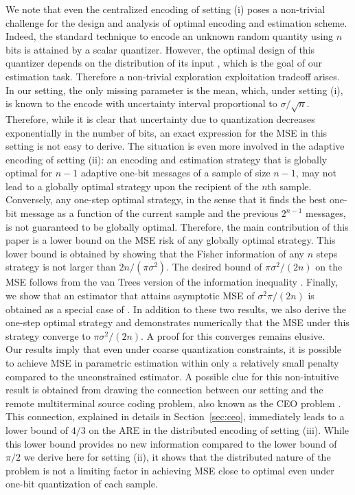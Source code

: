 \documentclass[letterpaper, conference]{IEEEtran}      %
\begin{document}
We note that even the centralized encoding of setting (i) poses a non-trivial challenge for the design and analysis of optimal encoding and estimation scheme. Indeed, the standard technique to encode an unknown random quantity using $n$ bits is attained by a scalar quantizer. However, the optimal design of this quantizer depends on the distribution of its input \cite{gray1998quantization}, which is the goal of our estimation task. Therefore a non-trivial exploration exploitation tradeoff arises. In our setting, the only missing parameter is the mean, which, under setting (i), is known to the encode with uncertainty interval proportional to $\sigma/\sqrt{n}$. Therefore, while it is clear that uncertainty due to quantization decreases exponentially in the number of bits, an exact expression for the MSE in this setting is not easy to derive. The situation is even more involved in the adaptive encoding of setting (ii): an encoding and estimation strategy that is globally optimal for $n-1$ adaptive one-bit messages of a sample of size $n-1$, may not lead to a globally optimal strategy upon the recipient of the $n$th sample. Conversely, any one-step optimal strategy, in the sense that it finds the best one-bit message as a function of the current sample and the previous $2^{n-1}$ messages, is not guaranteed to be globally optimal. Therefore, the main contribution of this paper is a lower bound on the MSE risk of any globally optimal strategy. This lower bound is obtained by showing that the Fisher information of any $n$ steps strategy is not larger than $2n/(\pi \sigma^2)$. The desired bound of $\pi \sigma^2/(2n)$ on the MSE follows from the van Trees version of the information inequality \cite{gill1995applications}. Finally, we show that an estimator that attains asymptotic MSE of $\sigma^2\pi/(2n)$ is obtained as a special case of \cite[Thm. 4]{polyak1992acceleration}. In addition to these two results, we also derive the one-step optimal strategy and demonstrates numerically that  the MSE under this strategy converge to $\pi \sigma^2/(2n)$. A proof for this converges remains elusive. \\

Our results imply that even under coarse quantization constraints, it is possible to achieve MSE in parametric estimation within only a relatively small penalty compared to the unconstrained estimator. A possible clue for this non-intuitive result is obtained from drawing the connection between our setting and the remote multiterminal source coding problem, also known as the CEO problem \cite{berger1996ceo, viswanathan1997quadratic, oohama1998rate, prabhakaran2004rate}. This connection, explained in details in Section~\ref{sec:ceo}, immediately leads to a lower bound of $4/3$ on the ARE in the distributed encoding of setting (iii). While this lower bound provides no new information compared to the lower bound of $\pi /2$ we derive here for setting (ii), it shows that the distributed nature of the problem is not a limiting factor in achieving MSE close to optimal even under one-bit quantization of each sample. \\
\end{document}
